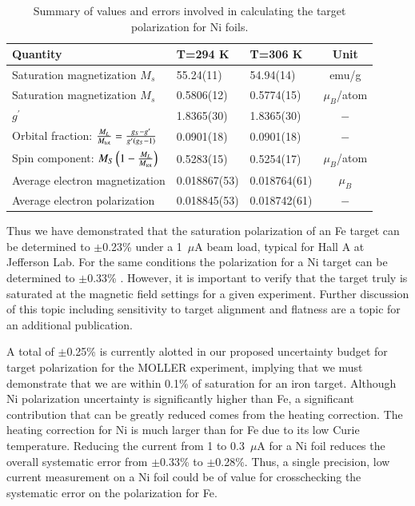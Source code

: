 \documentclass[preprint,12pt]{elsarticle}
\begin{document}
{\begin{table}[h]
\caption{\label{tab:final_errors_Ni}Summary of values and errors involved in calculating the target polarization for Ni foils.}
\begin{center}
\begin{tabular}{|l|l|l|c|}\hline
Quantity&T=294 K&T=306 K&Unit\\\hline
Saturation magnetization $M_s$ &55.24(11)&54.94(14)&emu/g\\
Saturation magnetization $M_s$&0.5806(12)&0.5774(15)&$\mu_B$/atom\\
$g^{\prime}$&1.8365(30)&1.8365(30)&$-$\\
Orbital fraction: $\frac{M_{L}}{M_{\rm tot}}=\frac{g_{S}-g^\prime}{g^\prime(g_{S}-1)}$&0.0901(18)&0.0901(18)&$-$\\
Spin component: $M_S\left(1-\frac{M_{L}}{M_{\rm tot}}\right)$&0.5283(15)&0.5254(17)&$\mu_B$/atom\\
Average electron magnetization&0.018867(53)&0.018764(61)&$\mu_B$\\
Average electron polarization&0.018845(53)&0.018742(61)&$-$\\\hline
\end{tabular}
\end{center}
\end{table}

Thus we have demonstrated that the saturation polarization of an Fe target can be determined to $\pm$0.23\% under a 1~$\mu$A beam load, typical for Hall A at Jefferson Lab. For the same conditions the polarization for a Ni target can be determined to $\pm$0.33\% . However, it is important to verify that the target truly is saturated at the magnetic field settings for a given experiment. Further discussion of this topic including sensitivity to target alignment and flatness are a topic for an additional publication. 

A total of $\pm$0.25\% is currently alotted in our proposed uncertainty budget for target polarization for the MOLLER experiment, implying that we must demonstrate that we are within 0.1\% of saturation for an iron target.  Although Ni polarization uncertainty is significantly higher than Fe, a significant contribution that can be greatly reduced comes from the heating correction. The heating correction for Ni is much larger than for Fe due to its low Curie temperature. Reducing the current from 1 to 0.3~$\mu$A for a Ni foil reduces the overall systematic error from $\pm$0.33\% to $\pm$0.28\%. Thus, a single precision, low current measurement on a Ni foil could be of value for crosschecking the systematic error on the polarization for Fe. 


}
\end{document}
